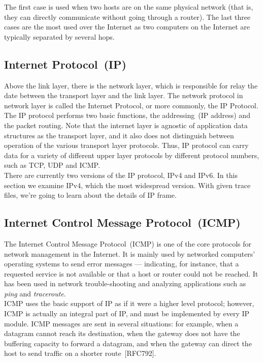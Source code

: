 \noindent The first case is used when two hosts are on the same physical network (that is, they can directly communicate without going through a router). The last three cases are the most used over the Internet as two computers on the Internet are typically separated by several hops.

\subsection{Internet Protocol~(IP)}
\par Above the link layer, there is the network layer, which is responsible for relay the date between the transport layer and the link layer. The network protocol in network layer is called the Internet Protocol, or more commonly, the IP Protocol. The IP protocol performs two basic functions, the addressing~(IP address) and the packet routing. Note that the internet layer is agnostic of application data structures as the transport layer, and it also does not distinguish between operation of the various transport layer protocols. Thus, IP protocol can carry data for a variety of different upper layer protocols by different protocol numbers, such as TCP, UDP and ICMP. \\

\noindent There are currently two versions of the IP protocol, IPv4 and IPv6. In this section we examine IPv4, which the most widespread version. With given trace files, we're going to learn about the details of IP frame. 

\subsection{Internet Control Message Protocol~(ICMP)}
\par The Internet Control Message Protocol~(ICMP) is one of the core protocols for network management in the Internet. It is mainly used by networked computers' operating systems to send error messages — indicating, for instance, that a requested service is not available or that a host or router could not be reached. It has been used in network trouble-shooting and analyzing applications such as \textit{ping} and \textit{traceroute}.\\

\noindent ICMP uses the basic support of IP as if it were a higher level protocol; however, ICMP is actually an integral part of IP, and must be implemented by every IP module. ICMP messages are sent in several situations: for example, when a datagram cannot reach its destination, when the gateway does not have the buffering capacity to forward a datagram, and when the gateway can direct the host to send traffic on a shorter route~[RFC792].\\

